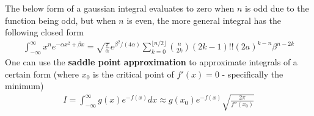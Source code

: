 The below form of a gaussian integral evaluates to zero when $n$ is odd due to the function being odd, but when $n$ is even, the more general integral has the following closed form
\begin{align}
\int_{-\infty}^{\infty} x^ne^{-\alpha x^2+\beta x}=\sqrt{\frac{\pi}{\alpha}}e^{\beta^2/(4\alpha)}\sum_{k=0}^{\lfloor n/2\rfloor} {{n}\choose{2k}} (2k-1)!!(2a)^{k-n}\beta^{n-2k}
\end{align}
One can use the \textbf{saddle point approximation} to approximate integrals of a certain form (where $x_0$ is the critical point of $f'(x)=0$ - specifically the minimum)
\begin{align}
I = \int_{-\infty}^{\infty}g(x)e^{-f(x)}dx \approx g(x_0)e^{-f(x)}\sqrt{\frac{2\pi}{f''(x_0)
}}
\end{align}

